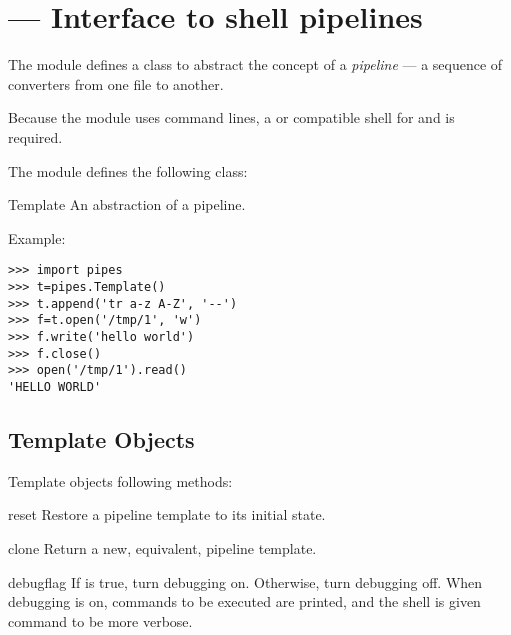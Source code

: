 \section{ ---
         Interface to shell pipelines}



The  module defines a class to abstract the concept of
a \emph{pipeline} --- a sequence of converters from one file to 
another.

Because the module uses  command lines, a \POSIX{} or
compatible shell for  and 
is required.

The  module defines the following class:

\begin{classdesc}{Template}{}
An abstraction of a pipeline.
\end{classdesc}

Example:

\begin{verbatim}
>>> import pipes
>>> t=pipes.Template()
>>> t.append('tr a-z A-Z', '--')
>>> f=t.open('/tmp/1', 'w')
>>> f.write('hello world')
>>> f.close()
>>> open('/tmp/1').read()
'HELLO WORLD'
\end{verbatim}


\subsection{Template Objects \label{template-objects}}

Template objects following methods:

\begin{methoddesc}{reset}{}
Restore a pipeline template to its initial state.
\end{methoddesc}

\begin{methoddesc}{clone}{}
Return a new, equivalent, pipeline template.
\end{methoddesc}

\begin{methoddesc}{debug}{flag}
If  is true, turn debugging on. Otherwise, turn debugging
off. When debugging is on, commands to be executed are printed, and
the shell is given  command to be more verbose.
\end{methoddesc}

